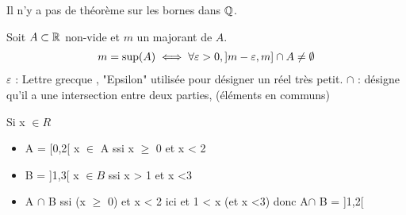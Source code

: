 \begin{remarque}
	Il n'y a pas de théorème sur les bornes dans $\mathbb{Q}$.
\end{remarque}

\begin{graybox}
	\begin{proposition}
		Soit $A \subset \mathbb{R}$ non-vide et $m$ un majorant de $A$. 
		\begin{align*}
			m = \textnormal{sup}(A) \iff \forall \varepsilon > 0, ]m - \varepsilon, m] \cap A \neq \emptyset
		\end{align*}
		$\varepsilon$ : \textnormal{Lettre grecque , "Epsilon" utilisée pour désigner un réel très petit.} %
		\newline
		$\cap$ : \textnormal{désigne qu'il a une intersection entre deux parties, (éléments en communs)}     
	\end{proposition}
\end{graybox}

\begin{exemple}
	Si x $\in R$
	\begin{itemize}
		\item \textnormal{A = [0,2[} \textnormal{x} $\in$ \textnormal{A ssi x} $\geq$ \textnormal{0 et x < 2}
		\item \textnormal{B = ]1,3[} \textnormal{x} $\in B$ \textnormal{ssi x > 1 et x <3}
		\item \textnormal{A} $\cap$ \textnormal{B} \textnormal{ssi (x} $\geq$ \textnormal{0) et x < 2 ici et 1 < x (et x <3) donc A}$\cap$ \textnormal{B = ]1,2[} 
	\end{itemize}
\end{exemple}

